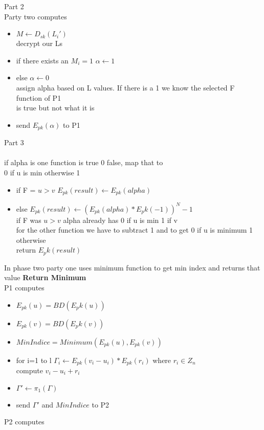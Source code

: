 \documentclass[10pt]{article} %
\begin{document}
Part 2\\
Party two computes
\begin{itemize}
	\item $M \gets D_{sk}(L_i')$
	\\decrypt our Ls
	\item if there exists an $M_i=1$
	\subitem $\alpha \gets 1$
	\item else
	\subitem $\alpha \gets 0$
	\\assign alpha based on L values. If there is a 1 we know the selected F function of P1
	\\is true but not what it is
	\item send $E_{pk}(\alpha)$ to P1
\end{itemize}
Part 3\\
\\if alpha is one function is true 0 false, map that to
\\0 if u is min otherwise 1
\begin{itemize}
	\item if F = $u>v$  
		\subitem $E_{pk}(result) \gets E_{pk}(alpha)$
	\item else	
		\subitem $E_{pk}(result) \gets (E_{pk}(alpha)*E_pk(-1))^N-1$
	\\if F was $u>v$ alpha already has 0 if u is min 1 if v
	\\for the other function we have to subtract 1 and to get 0 if u is minimum 1 otherwise
	\\return $E_pk(result)$
\end{itemize}

In phase two party one uses minimum function to get min index and returns that value
\textbf{Return Minimum}\\
P1 computes
\begin{itemize}
	\item $E_{pk}(u)  = BD(E_pk(u))$
	\item $E_{pk}(v)  = BD(E_pk(v))$
	\item $MinIndice = Minimum(E_{pk}(u),E_{pk}(v))$
	\item for i=1 to l
 		\subitem $\Gamma_i \gets E_{pk}(v_i - u_i) * E_{pk}(r_i)$ where $r_i \in Z_n$
 		\\compute $v_i - u_i +r_i$
 	\item  $\Gamma' \gets \pi_1(\Gamma)$
 	\item send $\Gamma'$ and $MinIndice$ to P2
\end{itemize}

P2 computes
\end{document}
